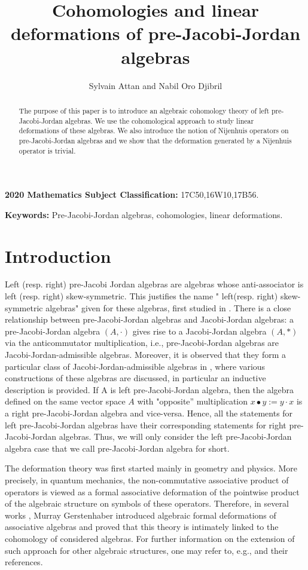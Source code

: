 \documentclass[12pt]{amsart}
\title{Cohomologies and linear deformations
	of pre-Jacobi-Jordan algebras
}
\author[S. Attan and N. Oro Djibril]
{ Sylvain Attan and Nabil Oro Djibril}
\begin{document}
	\maketitle
	\begin{abstract}
		The purpose of this paper is to introduce an algebraic cohomology  theory of left pre-Jacobi-Jordan algebras. We use the cohomological approach to study linear deformations of these algebras. We also introduce the notion of Nijenhuis operators on pre-Jacobi-Jordan algebras and we show that the deformation generated by a Nijenhuis operator is trivial. 
	\end{abstract}
	{\bf 2020 Mathematics Subject Classification:} 17C50,16W10,17B56. 
	
	{\bf Keywords:}	Pre-Jacobi-Jordan algebras, cohomologies, linear deformations.
	\section{Introduction}
	
	Left (resp. right) pre-Jacobi Jordan algebras are algebras whose anti-associator is left (resp. right) skew-symmetric. This justifies the name " left(resp. right) skew-symmetric algebras" given for these algebras, first studied in \cite{absb}. There is a close relationship between pre-Jacobi-Jordan algebras and Jacobi-Jordan algebras: a pre-Jacobi-Jordan algebra $(A, \cdot)$ gives rise to a Jacobi-Jordan algebra $(A, \ast )$ via the anticommutator
	multiplication, i.e., pre-Jacobi-Jordan algebras are Jacobi-Jordan-admissible algebras. Moreover, it is observed that they form a particular class of Jacobi-Jordan-admissible algebras in \cite{absbmm}, where various constructions of these algebras are discussed, in particular an inductive description is provided.  If A is left
	pre-Jacobi-Jordan algebra, then the algebra defined on the same vector space $A$ with "opposite” multiplication $x\bullet y:=
	y\cdot x$ is a right pre-Jacobi-Jordan algebra and vice-versa. Hence, all the statements for left pre-Jacobi-Jordan algebras have their
	corresponding statements for right pre-Jacobi-Jordan algebras. Thus, we will only consider the left pre-Jacobi-Jordan algebra case that we call pre-Jacobi-Jordan algebra for short.
	
	The deformation theory was first started mainly in geometry and physics. More precisely, in quantum mechanics, the non-commutative associative product of operators  is viewed  as a formal associative deformation of the pointwise product of the algebraic structure on symbols of these operators. Therefore, in several works \cite{mger1,mger2,mger3,mger4}, Murray Gerstenhaber introduced algebraic formal deformations of associative algebras and proved that  this theory is intimately linked to the cohomology of  considered algebras. For further information on the extension of such  approach for other algebraic structures, one may refer to, e.g., \cite{haam1,haam2, meam} and their references.
	
\end{document}
